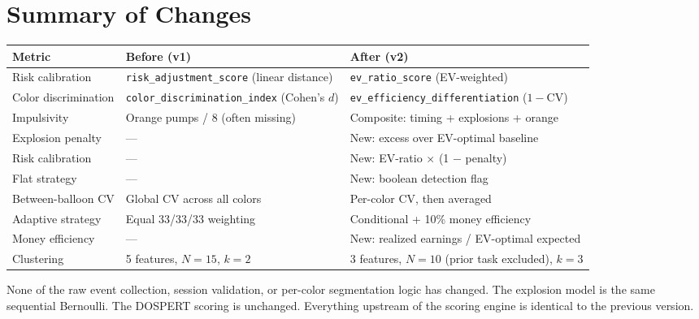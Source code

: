 \documentclass[11pt,a4paper]{article}
\begin{document}
\section{Summary of Changes}

\begin{table}[H]
\centering\small
\begin{tabular}{@{}lll@{}}
\toprule
\textbf{Metric} & \textbf{Before (v1)} & \textbf{After (v2)} \\
\midrule
Risk calibration    & \texttt{risk\_adjustment\_score} (linear distance) & \texttt{ev\_ratio\_score} (EV-weighted) \\
Color discrimination & \texttt{color\_discrimination\_index} (Cohen's $d$) & \texttt{ev\_efficiency\_differentiation} ($1 - \text{CV}$) \\
Impulsivity         & Orange pumps / 8 (often missing) & Composite: timing + explosions + orange \\
Explosion penalty   & --- & New: excess over EV-optimal baseline \\
Risk calibration    & --- & New: EV-ratio $\times$ (1 $-$ penalty) \\
Flat strategy       & --- & New: boolean detection flag \\
Between-balloon CV  & Global CV across all colors & Per-color CV, then averaged \\
Adaptive strategy   & Equal 33/33/33 weighting & Conditional + 10\% money efficiency \\
Money efficiency    & --- & New: realized earnings / EV-optimal expected \\
Clustering          & 5 features, $N=15$, $k=2$ & 3 features, $N=10$ (prior task excluded), $k=3$ \\
\bottomrule
\end{tabular}
\end{table}

None of the raw event collection, session validation, or per-color
segmentation logic has changed. The explosion model is the same sequential
Bernoulli. The DOSPERT scoring is unchanged. Everything upstream of the
scoring engine is identical to the previous version.
\end{document}
